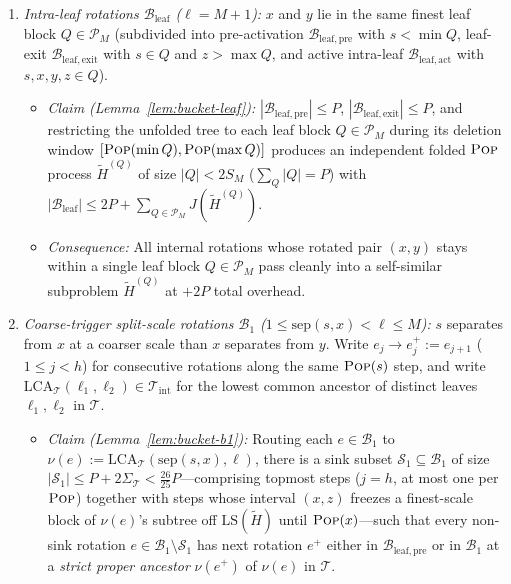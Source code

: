 \documentclass[11pt]{article}
\theoremstyle{definition}
\theoremstyle{remark}
\newcommand{\LS}{\mathrm{LS}}
\newcommand{\LCA}{\mathrm{LCA}}
\newcommand{\sep}{\mathrm{sep}}
\newcommand{\POP}{\textnormal{\scshape Pop}}
\begin{document}
\begin{enumerate}[label=(\arabic*), leftmargin=2em, itemsep=2pt]
  \item \emph{Intra-leaf rotations $\mathcal{B}_{\mathrm{leaf}}$ ($\ell = M + 1$):} $x$ and $y$ lie in the same finest leaf block $Q \in \mathcal{P}_M$ (subdivided into pre-activation $\mathcal{B}_{\mathrm{leaf,pre}}$ with $s < \min Q$, leaf-exit $\mathcal{B}_{\mathrm{leaf,exit}}$ with $s \in Q$ and $z > \max Q$, and active intra-leaf $\mathcal{B}_{\mathrm{leaf,act}}$ with $s, x, y, z \in Q$).
  \begin{itemize}[leftmargin=1.5em, itemsep=1pt]
    \item \emph{Claim (Lemma~\ref{lem:bucket-leaf}):} $|\mathcal{B}_{\mathrm{leaf,pre}}| \le P$, $|\mathcal{B}_{\mathrm{leaf,exit}}| \le P$, and restricting the unfolded tree to each leaf block $Q \in \mathcal{P}_M$ during its deletion window $[\POP(\min Q), \POP(\max Q)]$ produces an independent folded $\POP$ process $\widetilde{H}^{(Q)}$ of size $|Q| < 2 S_M$ ($\sum_Q |Q| = P$) with $|\mathcal{B}_{\mathrm{leaf}}| \le 2P + \sum_{Q \in \mathcal{P}_M} J(\widetilde{H}^{(Q)})$.
    \item \emph{Consequence:} All internal rotations whose rotated pair $(x, y)$ stays within a single leaf block $Q \in \mathcal{P}_M$ pass cleanly into a self-similar subproblem $\widetilde{H}^{(Q)}$ at $+2P$ total overhead.
  \end{itemize}
  \item \emph{Coarse-trigger split-scale rotations $\mathcal{B}_1$ ($1 \le \sep(s, x) < \ell \le M$):} $s$ separates from $x$ at a coarser scale than $x$ separates from $y$. Write $e_j \to e_j^+ := e_{j+1}$ ($1 \le j < h$) for consecutive rotations along the same $\POP(s)$ step, and write $\LCA_{\mathcal{T}}(\ell_1, \ell_2) \in \mathcal{T}_{\mathrm{int}}$ for the lowest common ancestor of distinct leaves $\ell_1, \ell_2$ in $\mathcal{T}$.
  \begin{itemize}[leftmargin=1.5em, itemsep=1pt]
    \item \emph{Claim (Lemma~\ref{lem:bucket-b1}):} Routing each $e \in \mathcal{B}_1$ to $\nu(e) := \LCA_{\mathcal{T}}(\sep(s, x), \ell)$, there is a sink subset $\mathcal{S}_1 \subseteq \mathcal{B}_1$ of size $|\mathcal{S}_1| \le P + 2\Sigma_{\mathcal{T}} < \frac{26}{25} P$---comprising topmost steps ($j = h$, at most one per $\POP$) together with steps whose interval $(x, z)$ freezes a finest-scale block of $\nu(e)$'s subtree off $\LS(\widetilde{H})$ until $\POP(x)$---such that every non-sink rotation $e \in \mathcal{B}_1 \setminus \mathcal{S}_1$ has next rotation $e^+$ either in $\mathcal{B}_{\mathrm{leaf,pre}}$ or in $\mathcal{B}_1$ at a \emph{strict proper ancestor} $\nu(e^+)$ of $\nu(e)$ in $\mathcal{T}$.

\end{itemize}
\end{enumerate}
\end{document}
